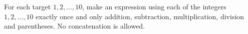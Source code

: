 For each target $1,2,\ldots,10$, make an expression using each of the integers $1,2,\ldots,10$ exactly once and only addition, subtraction, multiplication, division and parentheses. No concatenation is allowed.
